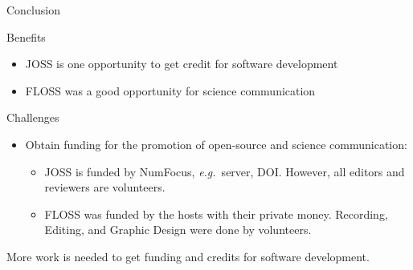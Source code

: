 \documentclass{beamer}
\begin{document}
\begin{frame}{Conclusion}

\begin{block}{Benefits }
    \begin{itemize}
        \item JOSS is one opportunity to get credit for software development
        \item FLOSS was a good opportunity for science communication 
    \end{itemize}
\end{block}

\begin{block}{Challenges }
    \begin{itemize}
        \item Obtain funding for the promotion of open-source and science communication:
        \begin{itemize}
            \item  JOSS is funded by NumFocus, \emph{e.g.}\ server, DOI. However, all editors and reviewers are volunteers.
            \item FLOSS was funded by the hosts with their private money. Recording, Editing, and Graphic Design were done by volunteers.
        \end{itemize}
    \end{itemize}
\end{block}
\begin{center}
    More work is needed to get funding and credits for software development.
\end{center}

\tiny \doclicenseThis
\end{frame}
\end{document}
